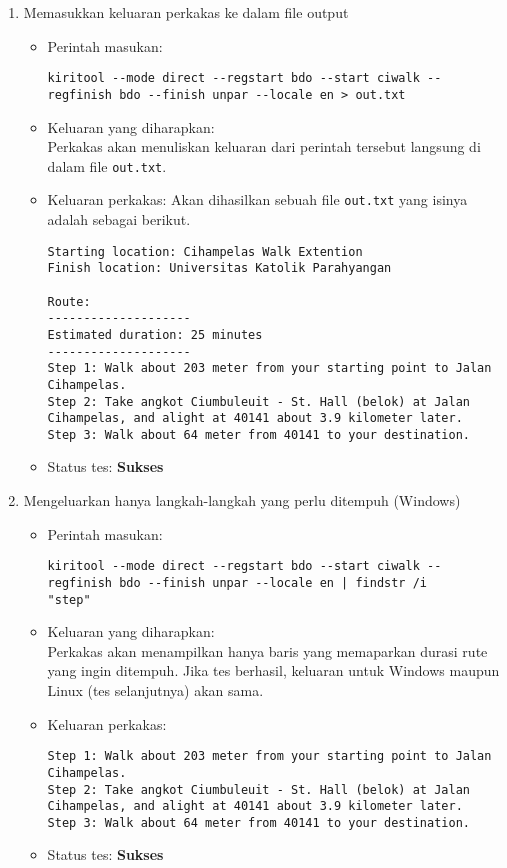 \begin{enumerate}	
	\item Memasukkan keluaran perkakas ke dalam file output
	\begin{itemize}
		\item Perintah masukan:
		\begin{lstlisting}
kiritool --mode direct --regstart bdo --start ciwalk --regfinish bdo --finish unpar --locale en > out.txt
		\end{lstlisting}
		\item Keluaran yang diharapkan: \\
		Perkakas akan menuliskan keluaran dari perintah tersebut langsung di dalam file \verb|out.txt|.
		\item Keluaran perkakas: Akan dihasilkan sebuah file \verb|out.txt| yang isinya adalah sebagai berikut.
		\begin{lstlisting}
Starting location: Cihampelas Walk Extention
Finish location: Universitas Katolik Parahyangan

Route:
--------------------
Estimated duration: 25 minutes
--------------------
Step 1: Walk about 203 meter from your starting point to Jalan Cihampelas.
Step 2: Take angkot Ciumbuleuit - St. Hall (belok) at Jalan Cihampelas, and alight at 40141 about 3.9 kilometer later.
Step 3: Walk about 64 meter from 40141 to your destination.
		\end{lstlisting}
		\item Status tes: \textbf{Sukses}
	\end{itemize}
	
	\item Mengeluarkan hanya langkah-langkah yang perlu ditempuh (Windows)
	\begin{itemize}
		\item Perintah masukan:
		\begin{lstlisting}
kiritool --mode direct --regstart bdo --start ciwalk --regfinish bdo --finish unpar --locale en | findstr /i
"step"
		\end{lstlisting}
		\item Keluaran yang diharapkan: \\
		Perkakas akan menampilkan hanya baris yang memaparkan durasi rute yang ingin ditempuh. Jika tes berhasil, keluaran untuk Windows maupun Linux (tes selanjutnya) akan sama.
		\item Keluaran perkakas:
		\begin{lstlisting}
Step 1: Walk about 203 meter from your starting point to Jalan Cihampelas.
Step 2: Take angkot Ciumbuleuit - St. Hall (belok) at Jalan Cihampelas, and alight at 40141 about 3.9 kilometer later.
Step 3: Walk about 64 meter from 40141 to your destination.
		\end{lstlisting}
		\item Status tes: \textbf{Sukses}
	\end{itemize}
	

\end{enumerate}
